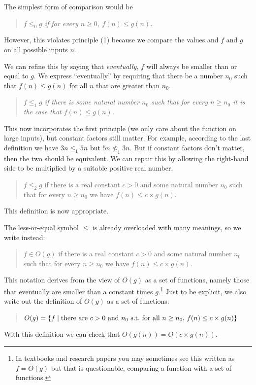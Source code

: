 The simplest form of comparison would be
\begin{quote}\it
  $f \leq_0 g$ if for every $n \geq 0$, $f(n) \leq g(n)$.
\end{quote}
However, this violates principle (1) because we compare
the values and $f$ and $g$ on all possible inputs $n$.

We can refine this by saying that \emph{eventually},
$f$ will always be smaller than or equal to $g$.  We express
``eventually'' by requiring that there be a number $n_0$
such that $f(n) \leq g(n)$ for all $n$ that are greater
than $n_0$.
\begin{quote}\it
  $f \leq_1 g$ if there is some natural number $n_0$ such that for
  every $n \geq n_0$ it is the case that $f(n) \leq g(n)$.
\end{quote}

This now incorporates the first principle (we only care about the
function on large inputs), but constant factors still matter.  For
example, according to the last definition we have $3n \leq_1 5n$ but
$5n \not\leq_1 3n$.  But if constant factors don't matter, then the
two should be equivalent.  We can repair this by allowing the
right-hand side to be multiplied by a suitable
positive real number.
\begin{quote}
  $f \leq_2 g$ if there is a real constant $c > 0$ and some natural number
$n_0$ such that for every $n \geq n_0$ we have $f(n) \leq c \times g(n)$.
\end{quote}
This definition is now appropriate.

The less-or-equal symbol $\leq$ is already overloaded with many
meanings, so we write instead:
\begin{quote}
  $f \in O(g)$ if there is a real constant $c > 0$ and some natural number
$n_0$ such that for every $n \geq n_0$ we have $f(n) \leq c \times g(n)$.
\end{quote}
This notation derives from the view of $O(g)$ as a set of
functions, namely those that eventually are smaller than a
constant times $g$.\footnote{In textbooks and research papers
you may sometimes see this written as $f = O(g)$ but that
is questionable, comparing a function with a set of functions.}
Just to be explicit, we also write out the definition
of $O(g)$ as a set of functions:
\begin{quote}
  $O(g) = \{ f \mid \mbox{there are $c > 0$ and $n_0$ s.t.\
for all $n \geq n_0$, $f(n) \leq c \times g(n)$} \}$
\end{quote}
With this definition we can check that $O(g(n)) = O(c \times g(n))$.

